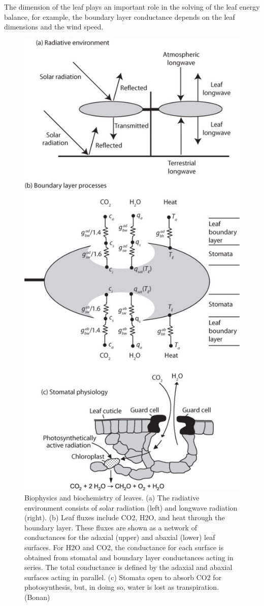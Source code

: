 \documentclass[
  12pt,
  oneside]{book}
\begin{document}
The dimension of the leaf plays an important role in the solving of the leaf energy balance, for example, the boundary layer conductance depends on the leaf dimensions and the wind speed.

\begin{figure}

{\centering \includegraphics[width=0.8\linewidth]{figures/chap3/f331_leaf_E_balance} 

}

\caption{Biophysics and biochemistry of leaves. (a) The radiative environment consists of solar radiation (left) and longwave radiation (right). (b) Leaf fluxes include CO2, H2O, and heat through the boundary layer. These fluxes are shown as a network of conductances for the adaxial (upper) and abaxial (lower) leaf surfaces. For H2O and CO2, the conductance for each surface is obtained from stomatal and boundary layer conductances acting in series. The total conductance is defined by the adaxial and abaxial surfaces acting in parallel. (c) Stomata open to absorb CO2 for photosynthesis, but, in doing so, water is lost as transpiration. (Bonan)}\label{fig:f331}
\end{figure}
\end{document}
